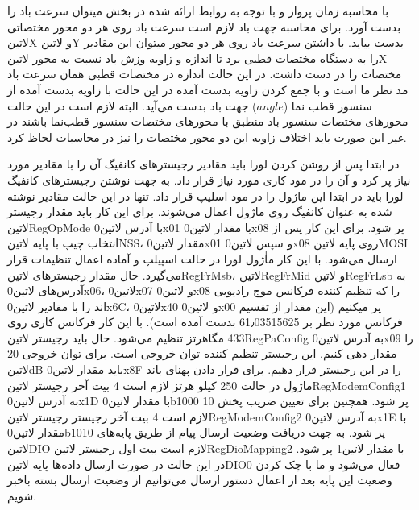 با محاسبه زمان پرواز و با توجه به روابط ارائه شده در بخش  میتوان سرعت باد را بدست آورد. برای محاسبه جهت باد لازم است سرعت باد روی هر دو محور مختصاتی ‌لاتین{X} و ‌لاتین{Y} بدست بیاید. با داشتن سرعت باد روی هر دو محور میتوان این مقادیر را به دستگاه مختصات قطبی برد تا اندازه و زاویه وزش باد نسبت به محور ‌لاتین{X} مختصات را در دست داشت. در این حالت اندازه در مختصات قطبی همان سرعت باد مد نظر ما است و با جمع کردن زاویه بدست آمده در این حالت با زاویه بدست آمده از سنسور قطب نما ($angle$) جهت باد بدست می‌آید. البته لازم است در این حالت محور‌های مختصات سنسور باد منطبق با محور‌های مختصات سنسور قطب‌نما باشند در غیر این صورت باید اختلاف زاویه این دو محور مختصات را نیز در محاسبات لحاظ کرد.

\label{sec:loraConfig}
در ابتدا پس از روشن کردن لورا باید مقادیر رجیستر‌های کانفیگ آن را با مقادیر مورد نیاز پر کرد و آن را در مود کاری مورد نیاز قرار داد. به جهت نوشتن رجیستر‌های کانفیگ لورا باید در ابتدا این ماژول را در مود اسلیپ قرار داد. تنها در این حالت مقادیر نوشته شده به عنوان کانفیگ روی ماژول اعمال می‌شوند. برای این کار باید مقدار رجیستر ‌لاتین{RegOpMode} با آدرس ‌لاتین{0x01} با مقدار ‌لاتین{0x08} پر شود. برای این کار پس از انتخاب چیپ با پایه ‌لاتین{NSS}، مقدار ‌لاتین{0x01} و سپس ‌لاتین{0x08} روی پایه ‌لاتین{MOSI} ارسال می‌شود. با این کار ماٰژول لورا در حالت اسپیلپ و آماده اعمال تنظیمات قرار می‌گیرد. حال مقدار رجیستر‌های ‌لاتین{RegFrMsb}، ‌لاتین{RegFrMid} و ‌لاتین{RegFrLsb} به آدرس‌های ‌لاتین{0x06}، ‌لاتین{0x07} و ‌لاتین{0x08} را که تنظیم کننده فرکانس موج رادیویی اند را با مقادیر ‌لاتین{0x6C}، ‌لاتین{0x40} و ‌لاتین{0x00} پر میکنیم (این مقدار از تقسیم فرکانس مورد نظر بر  61٫03515625 بدست آمده است). با این کار فرکانس کاری روی 433 مگاهرتز تنظیم می‌شود. حال باید رجیستر ‌لاتین{RegPaConfig} به آدرس ‌لاتین{0x09} را مقدار دهی کنیم. این رجیستر تنظیم کننده توان خروجی است. برای توان خروجی 20 ‌لاتین{dB} باید مقدار ‌لاتین{0x8F} را در این رجیستر قرار دهیم. برای قرار دادن پهنای باند ماژول در حالت 250 کیلو هرتز لازم است 4 بیت آخر رجیستر ‌لاتین{RegModemConfig1} به آدرس ‌لاتین{0x1D} با مقدار ‌لاتین{0b1000} پر شود. همچنین برای تعیین ضریب پخش 10 لازم است 4 بیت آخر رجیستر رجیستر ‌لاتین{RegModemConfig2} به آدرس ‌لاتین{0x1E} با مقدار ‌لاتین{0b1010} پر شود. به جهت دریافت وضعیت ارسال پیام از طریق پایه‌های ‌لاتین{DIO} لازم است بیت اول رجیستر ‌لاتین{RegDioMapping2} با مقدار ‌لاتین{1} پر شود. در این حالت در صورت ارسال داده‌ها پایه ‌لاتین{DIO0} فعال می‌شود و ما با چک کردن وضعیت این پایه بعد از اعمال دستور ارسال می‌توانیم از وضعیت ارسال بسته باخبر شویم. 

